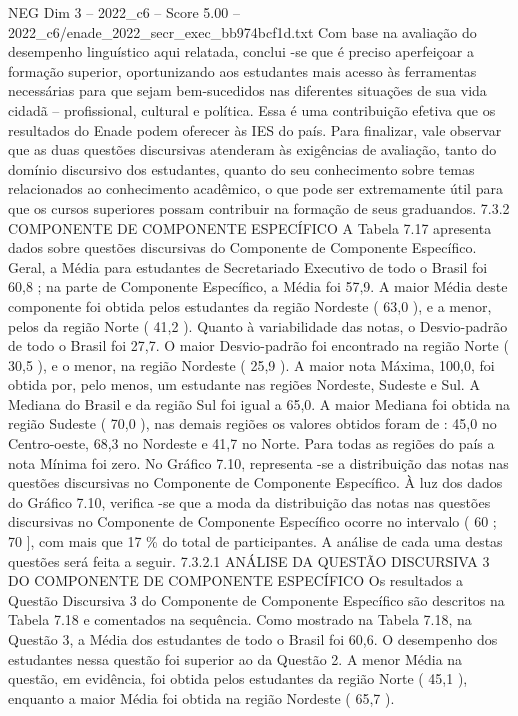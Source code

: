 \begin{textsample}{NEG Dim 3 – 2022\_c6 – Score 5.00 – 2022\_c6/enade\_2022\_secr\_exec\_bb974bcf1d.txt}
Com base na avaliação do desempenho linguístico aqui relatada, conclui -se que é preciso aperfeiçoar a formação superior, oportunizando aos estudantes mais acesso às ferramentas necessárias para que sejam bem-sucedidos nas diferentes situações de sua vida cidadã – profissional, cultural e política.
Essa é uma contribuição efetiva que os resultados do Enade podem oferecer às IES do país.
Para finalizar, vale observar que as duas questões discursivas atenderam às exigências de avaliação, tanto do domínio discursivo dos estudantes, quanto do seu conhecimento sobre temas relacionados ao conhecimento acadêmico, o que pode ser extremamente útil para que os cursos superiores possam contribuir na formação de seus graduandos. 7.3.2 COMPONENTE DE COMPONENTE ESPECÍFICO A Tabela 7.17 apresenta dados sobre questões discursivas do Componente de Componente Específico.
Geral, a Média para estudantes de Secretariado Executivo de todo o Brasil foi 60,8 ; na parte de Componente Específico, a Média foi 57,9.
A maior Média deste componente foi obtida pelos estudantes da região Nordeste ( 63,0 ), e a menor, pelos da região Norte ( 41,2 ).
Quanto à variabilidade das notas, o Desvio-padrão de todo o Brasil foi 27,7.
O maior Desvio-padrão foi encontrado na região Norte ( 30,5 ), e o menor, na região Nordeste ( 25,9 ).
A maior nota Máxima, 100,0, foi obtida por, pelo menos, um estudante nas regiões Nordeste, Sudeste e Sul.
A Mediana do Brasil e da região Sul foi igual a 65,0.
A maior Mediana foi obtida na região Sudeste ( 70,0 ), nas demais regiões os valores obtidos foram de : 45,0 no Centro-oeste, 68,3 no Nordeste e 41,7 no Norte.
Para todas as regiões do país a nota Mínima foi zero.
No Gráfico 7.10, representa -se a distribuição das notas nas questões discursivas no Componente de Componente Específico.
À luz dos dados do Gráfico 7.10, verifica -se que a moda da distribuição das notas nas questões discursivas no Componente de Componente Específico ocorre no intervalo ( 60 ; 70 ], com mais que 17 \% do total de participantes.
A análise de cada uma destas questões será feita a seguir. 7.3.2.1 ANÁLISE DA QUESTÃO DISCURSIVA 3 DO COMPONENTE DE COMPONENTE ESPECÍFICO Os resultados a Questão Discursiva 3 do Componente de Componente Específico são descritos na Tabela 7.18 e comentados na sequência.
Como mostrado na Tabela 7.18, na Questão 3, a Média dos estudantes de todo o Brasil foi 60,6.
O desempenho dos estudantes nessa questão foi superior ao da Questão 2.
A menor Média na questão, em evidência, foi obtida pelos estudantes da região Norte ( 45,1 ), enquanto a maior Média foi obtida na região Nordeste ( 65,7 ).

\end{textsample}
